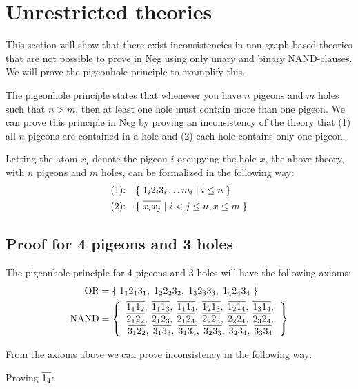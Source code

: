 \section{Unrestricted theories}
\label{sec:Unrestricted theories}
This section will show that there exist inconsistencies in non-graph-based theories that are not possible to prove in Neg using only unary and binary NAND-clauses.
We will prove the pigeonhole principle to examplify this.

The pigeonhole principle states that whenever you have $n$ pigeons and $m$ holes such that $n > m$, then at least one hole must contain more than one pigeon.
We can prove this principle in Neg by proving an inconsistency of the theory that (1) all $n$ pigeons are contained in a hole and (2) each hole contains only one pigeon.

Letting the atom $x_i$ denote the pigeon $i$ occupying the hole $x$, the above theory, with $n$ pigeons and $m$ holes, can be formalized in the following way:
\begin{align}
  \text{(1):}\quad &\{ \; 1_i2_i3_i\dots m_i \;|\; i \leq n \; \}\\
  \text{(2):}\quad &\{ \; \ol{x_ix_j} \;|\; i < j \leq n, x \leq m \; \}
\end{align}
\subsection{Proof for 4 pigeons and 3 holes}
\label{sub:Proof for 4 pigeons and 3 holes}
The pigeonhole principle for 4 pigeons and 3 holes will have the following axioms:
\begin{align}
  \text{OR} &= \{ \; 1_12_13_1,\; 1_22_23_2,\; 1_32_33_3,\; 1_42_43_4 \; \} \label{eq:ax1}\\
  \text{NAND} &= \left \{
  \begin{tabular}{c}
    $\ol{1_11_2},\;\ol{1_11_3},\;\ol{1_11_4},\;\ol{1_21_3},\;\ol{1_21_4},\;\ol{1_31_4},$\\
    $\ol{2_12_2},\;\ol{2_12_3},\;\ol{2_12_4},\;\ol{2_22_3},\;\ol{2_22_4},\;\ol{2_32_4},$\\
    $\ol{3_12_2},\;\ol{3_13_3},\;\ol{3_13_4},\;\ol{3_23_3},\;\ol{3_23_4},\;\ol{3_33_4}$
  \end{tabular}
  \right \} \label{eq:ax2}
\end{align}

From the axioms above we can prove inconsistency in the following way:

Proving $\ol{1_4}$:
\begin{prooftree*}[separation=0.8em, rule margin=1ex]
\end{prooftree*}

